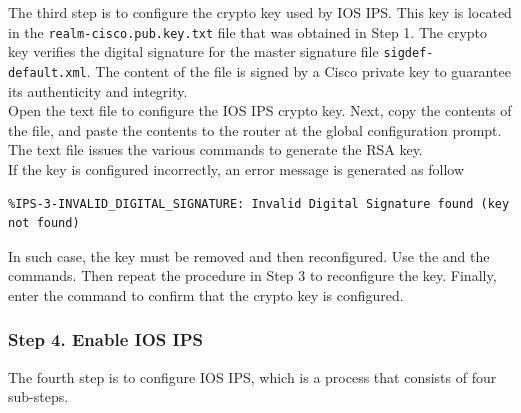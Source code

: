 The third step is to configure the crypto key used by IOS IPS. This key is located in the \verb|realm-cisco.pub.key.txt| file that was obtained in Step 1. The crypto key verifies the digital signature for the master signature file \verb|sigdef-default.xml|. The content of the file is signed by a Cisco private key to guarantee its authenticity and integrity.\\

Open the text file to configure the IOS IPS crypto key. Next, copy the contents of the file, and paste the contents to the router at the global configuration prompt. The text file issues the various commands to generate the RSA key.\\

If the key is configured incorrectly, an error message is generated as follow

\begin{verbatim}
%IPS-3-INVALID_DIGITAL_SIGNATURE: Invalid Digital Signature found (key not found)
\end{verbatim}

In such case, the key must be removed and then reconfigured. Use the  and the  commands. Then repeat the procedure in Step 3 to reconfigure the key. Finally, enter the  command to confirm that the crypto key is configured.

\subsubsection{Step 4. Enable IOS IPS}

The fourth step is to configure IOS IPS, which is a process that consists of four sub-steps.

